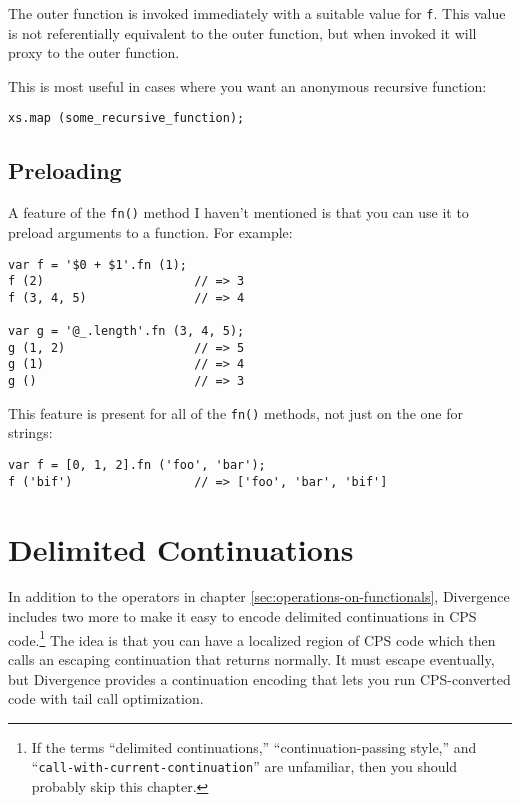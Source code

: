 \documentclass{report}
\begin{document}
      The outer function is invoked immediately with a suitable value for \verb|f|. This value is not referentially equivalent to the outer function, but when invoked it will proxy to the
      outer function.

      This is most useful in cases where you want an anonymous recursive function:

\begin{verbatim}
xs.map (some_recursive_function);
\end{verbatim}

\section {Preloading}
      \label{sec:preloading}
      A feature of the \verb|fn()| method I haven't mentioned is that you can use it to preload arguments to a function. For example:

\begin{verbatim}
var f = '$0 + $1'.fn (1);
f (2)                     // => 3
f (3, 4, 5)               // => 4

var g = '@_.length'.fn (3, 4, 5);
g (1, 2)                  // => 5
g (1)                     // => 4
g ()                      // => 3
\end{verbatim}

      This feature is present for all of the \verb|fn()| methods, not just on the one for strings:

\begin{verbatim}
var f = [0, 1, 2].fn ('foo', 'bar');
f ('bif')                 // => ['foo', 'bar', 'bif']
\end{verbatim}

\chapter {Delimited Continuations}
    \label{sec:delimited-continuations}

    In addition to the operators in chapter \ref{sec:operations-on-functionals}, Divergence includes two more to make it easy to encode delimited continuations in CPS code.\footnote{If the
    terms ``delimited continuations,'' ``continuation-passing style,'' and ``{\tt call-with-current-continuation}'' are unfamiliar, then you should probably skip this chapter.} The idea is
    that you can have a localized region of CPS code which then calls an escaping continuation that returns normally. It must escape eventually, but Divergence provides a continuation encoding
    that lets you run CPS-converted code with tail call optimization.
\end{document}
